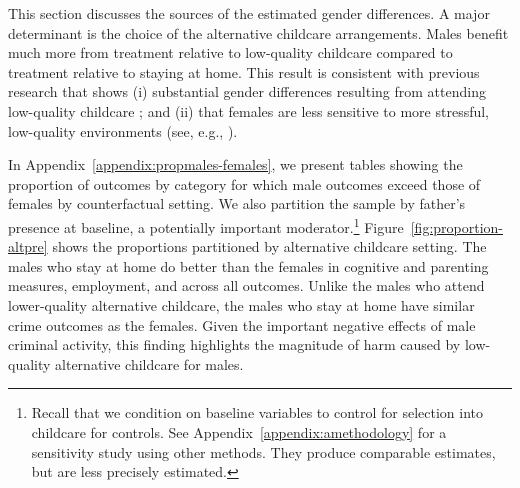 This section discusses the sources of the estimated gender differences. A major determinant is the choice of the alternative childcare arrangements. Males benefit much more from treatment relative to low-quality childcare compared to treatment relative to staying at home. This result is consistent with previous research that shows (i) substantial gender differences resulting from attending low-quality childcare \citep{Kottelenberg_Lehrer_2014_Gender-Effects,Baker_Gruber_Milligan_2015_Noncog_Defects}; and (ii) that females are less sensitive to more stressful, low-quality environments (see, e.g., \citealp{Golding_Fitzgerald_2017_IMHJ,Autor-etal_2015_Family-Disadvantage}).

In Appendix~\ref{appendix:propmales-females}, we present tables showing the proportion of outcomes by category for which male outcomes exceed those of females by counterfactual setting. We also partition the sample by father's presence at baseline, a potentially important moderator.\footnote{Recall that we condition on baseline variables to control for selection into childcare for controls. See Appendix~\ref{appendix:amethodology} for a sensitivity study using other methods. They produce comparable estimates, but are less precisely estimated.} Figure~\ref{fig:proportion-altpre} shows the proportions partitioned by alternative childcare setting. The males who stay at home do better than the females in cognitive and parenting measures, employment, and across all outcomes. Unlike the males who attend lower-quality alternative childcare, the males who stay at home have similar crime outcomes as the females. Given the important negative effects of male criminal activity, this finding highlights the magnitude of harm caused by low-quality alternative childcare for males.

